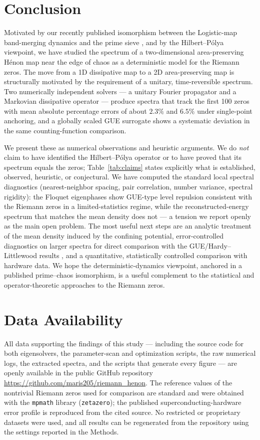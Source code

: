\documentclass[11pt]{article}
\begin{document}
\section{Conclusion}

Motivated by our recently published isomorphism between the Logistic-map band-merging dynamics and the prime sieve \cite{wang2026}, and by the Hilbert--P\'olya viewpoint, we have studied the spectrum of a two-dimensional area-preserving H\'enon map near the edge of chaos as a deterministic model for the Riemann zeros. The move from a 1D dissipative map to a 2D area-preserving map is structurally motivated by the requirement of a unitary, time-reversible spectrum. Two numerically independent solvers --- a unitary Fourier propagator and a Markovian dissipative operator --- produce spectra that track the first 100 zeros with mean absolute percentage errors of about $2.3\%$ and $6.5\%$ under single-point anchoring, and a globally scaled GUE surrogate shows a systematic deviation in the same counting-function comparison.

We present these as numerical observations and heuristic arguments. We do \emph{not} claim to have identified the Hilbert--P\'olya operator or to have proved that its spectrum equals the zeros; Table~\ref{tab:claims} states explicitly what is established, observed, heuristic, or conjectural. We have computed the standard local spectral diagnostics (nearest-neighbor spacing, pair correlation, number variance, spectral rigidity): the Floquet eigenphases show GUE-type level repulsion consistent with the Riemann zeros in a limited-statistics regime, while the reconstructed-energy spectrum that matches the mean density does not --- a tension we report openly as the main open problem. The most useful next steps are an analytic treatment of the mean density induced by the confining potential, error-controlled diagnostics on larger spectra for direct comparison with the GUE/Hardy--Littlewood results \cite{keating2019}, and a quantitative, statistically controlled comparison with hardware data. We hope the deterministic-dynamics viewpoint, anchored in a published prime--chaos isomorphism, is a useful complement to the statistical and operator-theoretic approaches to the Riemann zeros.

\section*{Data Availability}
All data supporting the findings of this study --- including the source code for both eigensolvers, the parameter-scan and optimization scripts, the raw numerical logs, the extracted spectra, and the scripts that generate every figure --- are openly available in the public GitHub repository \url{https://github.com/maris205/riemann_henon}. The reference values of the nontrivial Riemann zeros used for comparison are standard and were obtained with the \texttt{mpmath} library (\texttt{zetazero}); the published superconducting-hardware error profile is reproduced from the cited source. No restricted or proprietary datasets were used, and all results can be regenerated from the repository using the settings reported in the Methods.
\end{document}
